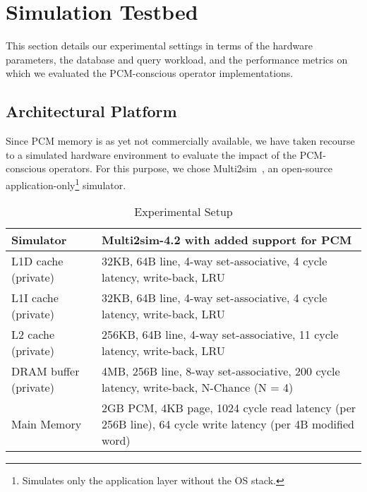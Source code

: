 \section{Simulation Testbed}
\label{sec:exp}

This section details our experimental settings in terms of the hardware
parameters, the database and query workload, and the performance metrics
on which we evaluated the PCM-conscious operator implementations.



\subsection{Architectural Platform}
Since PCM memory is as yet not commercially available, we
have taken recourse to a simulated hardware environment to
evaluate the impact of the PCM-conscious operators.  For this
purpose, we chose Multi2sim~\cite{multi2sim}, an open-source
application-only\footnote{Simulates only the application layer without
the OS stack.} simulator.

\begin{center}
\begin{table}[h]
\begin{small}
\caption{Experimental Setup}
\label{table:setup}
\begin{tabular}{p{4cm}p{12cm}}
\toprule
Simulator & Multi2sim-4.2 with added support for PCM\\ \hline

L1D cache (private) & 32KB, 64B line, 4-way set-associative, 4 cycle latency, write-back, LRU\\ \hline
L1I cache (private) & 32KB, 64B line, 4-way set-associative, 4 cycle latency, write-back, LRU\\ \hline   
L2 cache (private) & 256KB, 64B line, 4-way set-associative, 11 cycle latency, write-back, LRU\\ \hline

DRAM buffer (private) & 4MB, 256B line, 8-way set-associative, 200 cycle latency, write-back, N-Chance (N = 4)\\ \hline

Main Memory & 2GB PCM, 4KB page, 1024 cycle read latency (per 256B line), 64 cycle write latency (per 4B modified word)\\ \bottomrule
\end{tabular}
\end{small}
\end{table}
\end{center}

